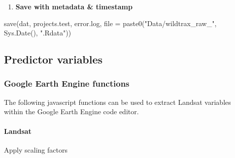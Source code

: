 \documentclass[
]{article}
\newenvironment{Shaded}{\begin{snugshade}}{\end{snugshade}}
\newcommand{\AttributeTok}[1]{\textcolor[rgb]{0.77,0.63,0.00}{#1}}
\newcommand{\FunctionTok}[1]{\textcolor[rgb]{0.00,0.00,0.00}{#1}}
\newcommand{\NormalTok}[1]{#1}
\newcommand{\StringTok}[1]{\textcolor[rgb]{0.31,0.60,0.02}{#1}}
\providecommand{\tightlist}{%
  \setlength{\itemsep}{0pt}\setlength{\parskip}{0pt}}
\begin{document}
\begin{enumerate}
\def\labelenumi{\arabic{enumi}.}
\setcounter{enumi}{6}
\tightlist
\item
  \textbf{Save with metadata \& timestamp}
\end{enumerate}

\begin{Shaded}
\begin{Highlighting}[]
\FunctionTok{save}\NormalTok{(dat, projects.test, error.log, }\AttributeTok{file =} \FunctionTok{paste0}\NormalTok{(}\StringTok{"Data/wildtrax\_raw\_"}\NormalTok{,}
    \FunctionTok{Sys.Date}\NormalTok{(), }\StringTok{".Rdata"}\NormalTok{))}
\end{Highlighting}
\end{Shaded}

\hypertarget{predictor-variables}{%
\subsection{Predictor variables}\label{predictor-variables}}

\hypertarget{google-earth-engine-functions}{%
\subsubsection{Google Earth Engine
functions}\label{google-earth-engine-functions}}

The following javascript functions can be used to extract Landsat
variables within the Google Earth Engine code editor.

\hypertarget{landsat}{%
\paragraph*{Landsat}\label{landsat}}

Apply scaling factors
\end{document}
